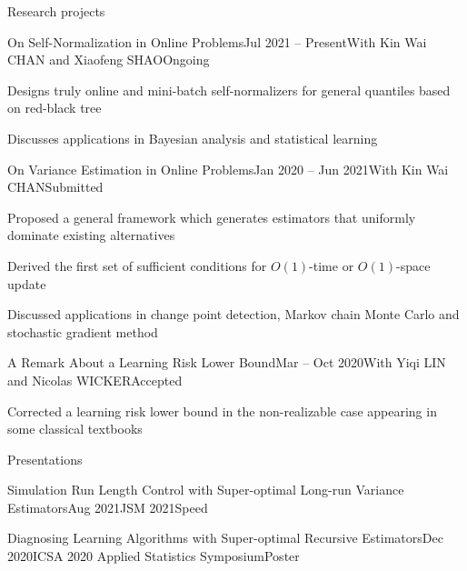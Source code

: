 \documentclass[10pt]{resume} %
\begin{document}
\begin{rSection}{Research projects}

\begin{rSubsection}{On Self-Normalization in Online Problems}{Jul 2021 -- Present}{With Kin Wai CHAN and Xiaofeng SHAO}{Ongoing}
\item Designs truly online and mini-batch self-normalizers for general quantiles based on red-black tree
\item Discusses applications in Bayesian analysis and statistical learning
\end{rSubsection}


\begin{rSubsection}{On Variance Estimation in Online Problems}{Jan 2020 -- Jun 2021}{With Kin Wai CHAN}{Submitted}
\item Proposed a general framework which generates estimators that uniformly dominate existing alternatives
\item Derived the first set of sufficient conditions for $O(1)$-time or $O(1)$-space update
\item Discussed applications in change point detection, Markov chain Monte Carlo and stochastic gradient method
\end{rSubsection}


\begin{rSubsection}{A Remark About a Learning Risk Lower Bound}{Mar -- Oct 2020}{With Yiqi LIN and Nicolas WICKER}{Accepted}
  \item Corrected a learning risk lower bound in the non-realizable case appearing in some classical textbooks
\end{rSubsection}

\end{rSection}


\begin{rSection}{Presentations}

\begin{rSecitem}{Simulation Run Length Control with Super-optimal Long-run Variance Estimators}{Aug 2021}{JSM 2021}{Speed}
\end{rSecitem}

\begin{rSecitem}{Diagnosing Learning Algorithms with Super-optimal Recursive Estimators}{Dec 2020}{ICSA 2020 Applied Statistics Symposium}{Poster}
\end{rSecitem}

\end{rSection}
\end{document}
